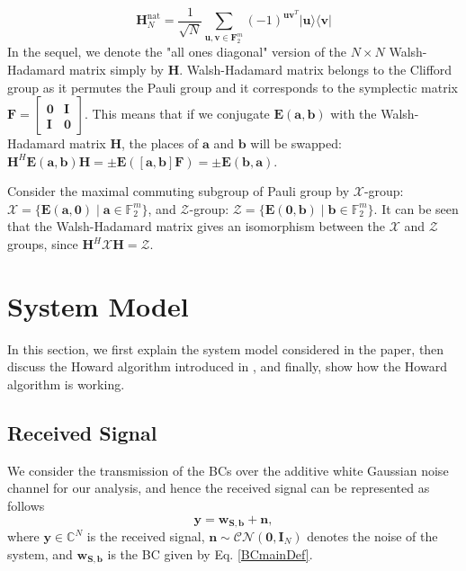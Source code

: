 \documentclass[lettersize,journal,onecolumn]{IEEEtran}
\begin{document}
\begin{equation}\label{Hrefomed}
	\mathbf{H}_N^{\text{nat}} = \frac{1}{\sqrt{N}} \sum_{\mathbf{u}, \mathbf{v} \in \mathbf{F}_2^m}{\left(-1\right)^{\mathbf{u} \mathbf{v}^T } |\mathbf{u}\rangle \langle\mathbf{v}|}
\end{equation}
 In the sequel, we denote the "all ones diagonal" version of the $N \times N$ Walsh-Hadamard matrix simply by $\mathbf{H}$. 
Walsh-Hadamard matrix belongs to the Clifford group as it permutes the Pauli group and it corresponds to the symplectic matrix $\mathbf{F} = \begin{bmatrix}
	\mathbf{0} & \mathbf{I} \\
	\mathbf{I} & \mathbf{0}
\end{bmatrix}$. This means that if we conjugate $\mathbf{E}(\mathbf{a},\mathbf{b})$ with the Walsh-Hadamard matrix $\mathbf{H}$, the places of $\mathbf{a}$ and $\mathbf{b}$ will be swapped: $\mathbf{H}^H\mathbf{E}(\mathbf{a},\mathbf{b})\mathbf{H} = \pm \mathbf{E}(\left[\mathbf{a},\mathbf{b}\right]\mathbf{F}) = \pm \mathbf{E}(\mathbf{b},\mathbf{a})$. 

Consider the maximal commuting subgroup of Pauli group by $\mathcal{X}$-group: $\mathcal{X} = \{\mathbf{E}(\mathbf{a},\mathbf{0}) \mid \mathbf{a} \in \mathbb{F}^m_2 \}$, and $\mathcal{Z}$-group:  $\mathcal{Z} = \{\mathbf{E}(\mathbf{0},\mathbf{b}) \mid \mathbf{b} \in \mathbb{F}^m_2 \}$. It can be seen that the Walsh-Hadamard matrix gives an isomorphism between the $\mathcal{X}$ and $\mathcal{Z}$ groups, since $\mathbf{H}^H\mathcal{X}\mathbf{H} = \mathcal{Z}$.
\section{System Model}
In this section, we first explain the system model considered in the paper, then discuss the Howard algorithm introduced in \cite{HowardAlg08}, and finally, show how the Howard algorithm is working.
\subsection{Received Signal}
We consider the transmission of the BCs over the additive white Gaussian noise channel for our analysis, and hence the received signal can be represented as follows
\begin{equation}
	\mathbf{y}=\mathbf{w}_{\mathbf{S, b}} + \mathbf{n},
\end{equation}
where $\mathbf{y}\in \mathbb{C}^N$ is the received signal, $\mathbf{n}\sim \mathcal{CN}\left(\mathbf{0}, \mathbf{I}_{N}\right)$ denotes the noise of the system, and $\mathbf{w}_{\mathbf{S,b}}$ is the BC given by Eq. \eqref{BCmainDef}.
\end{document}
